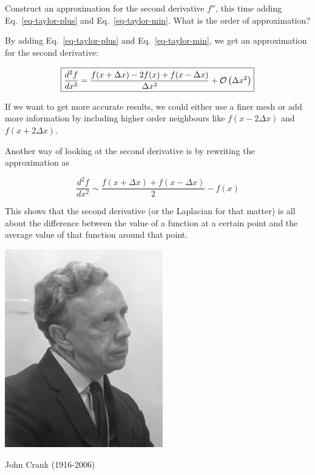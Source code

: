\begin{cue}
Construct an approximation for the second derivative $f''$, this time adding Eq.~\ref{eq-taylor-plus} and Eq.~\ref{eq-taylor-min}. What is the order of approximation? 
\end{cue}

By adding Eq.~\ref{eq-taylor-plus} and Eq.~\ref{eq-taylor-min}, we get an approximation for the second derivative:

\begin{equation}
\fbox{$\displaystyle
\frac{d^2 f}{d x^2} = \frac{f(x + \Delta x) -2 f(x) + f(x- \Delta x)}{ \Delta x^2} + \mathcal{O}\left(\Delta x^2\right)
$}
\end{equation} 

If we want to get more accurate results, we could either use a finer mesh or add more information by including higher order neighbours like $f(x-2\Delta x)$ and $f(x+2\Delta x)$.

Another way of looking at the second derivative is by rewriting the approximation as

\begin{equation}
\frac{d^2 f}{d x^2} \sim  \frac{f(x + \Delta x) + f(x - \Delta x)}{2} - f(x)
\end{equation}

\noindent{}This shows that the second derivative (or the Laplacian for that matter) is all about the difference between the value of a function at a certain point and the average value of that function around that point.

\begin{marginfigure}[1.0cm]
  \includegraphics{numeric/figures/j_crank}
  \caption{John Crank (1916-2006)}
\end{marginfigure}

